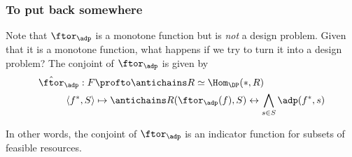 \subsubsection{To put back somewhere}
Note that $\ftor_\adp$ is a monotone function but is \emph{not} a design problem.
Given that it is a monotone function, what happens if we try to turn it into a design problem?
The conjoint of $\ftor_\adp$ is given by
\begin{equation*}
    \begin{aligned}
        \hat \ftor_\adp : F    & \profto \antichains R \simeq \Hom_\DP(\ast, R)                                          \\
        \langle f^*, S \rangle & \mapsto \antichains R(\ftor_\adp(f), S) \leftrightarrow \bigwedge_{s\in S} \adp(f^*, s)
    \end{aligned}
\end{equation*}

In other words, the conjoint of $\ftor_\adp$ is an indicator function for subsets of feasible resources.
